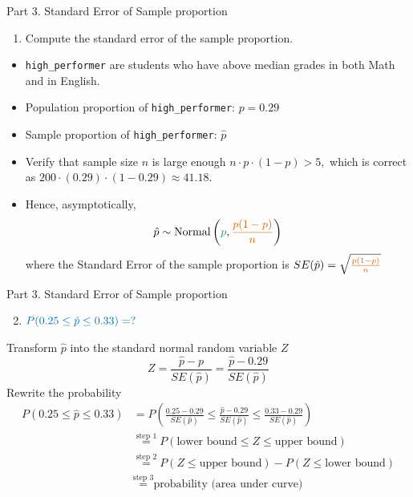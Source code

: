 \documentclass[
  10pt,
  ignorenonframetext,
]{beamer}
\providecommand{\tightlist}{%
  \setlength{\itemsep}{0pt}\setlength{\parskip}{0pt}}
\begin{document}
\begin{frame}[fragile]{Part 3. Standard Error of Sample proportion}
\protect\hypertarget{part-3.-standard-error-of-sample-proportion-1}{}
\begin{enumerate}
\tightlist
\item
  Compute the standard error of the sample proportion.
\end{enumerate}

\begin{itemize}
\item
  \texttt{high\_performer} are students who have above median grades in
  both Math and in English.
\item
  Population proportion of \texttt{high\_performer}: \(p = 0.29\)
\item
  Sample proportion of \texttt{high\_performer}: \(\hat{p}\)
\item
  Verify that sample size \(n\) is large enough
  \(n \cdot p \cdot (1-p) > 5,\) which is correct as
  \(200 \cdot (0.29) \cdot (1-0.29) \approx 41.18\).
\item
  Hence, asymptotically, \[
  \hat{p} \sim \text{Normal} \left({\color{green}{p}}, {\color{red}{\frac{p(1-p)}{n}}} \right)
  \] where the Standard Error of the sample proportion is
  \(SE(\hat{p}) = \sqrt{{\color{red}{\frac{p(1-p)}{n}}}}\)
\end{itemize}
\end{frame}

\begin{frame}{Part 3. Standard Error of Sample proportion}
\protect\hypertarget{part-3.-standard-error-of-sample-proportion-2}{}
\begin{enumerate}
\setcounter{enumi}{1}
\tightlist
\item
  \(\color{blue}{P(0.25 \leq \hat{p} \leq 0.33) = ?}\)
\end{enumerate}

\normalsize

Transform \(\hat{p}\) into the standard normal random variable \(Z\)
\small \[
Z = \frac{\hat{p} - p}{SE(\hat{p})} = \frac{\hat{p} - 0.29}{SE(\hat{p})}
\] \normalsize Rewrite the probability \small \[
\begin{aligned}
P(0.25 \leq \hat{p} \leq 0.33) &= P\left(\frac{0.25 - 0.29}{SE(\hat{p})} \leq \frac{\hat{p} - 0.29}{SE(\hat{p})} \leq \frac{0.33 - 0.29}{SE(\hat{p})}\right)\\
&\overset{\text{step 1}}{=} P\left(\text{lower bound} \leq Z \leq \text{upper bound}\right)\\
&\overset{\text{step 2}}{=} P\left(Z \leq \text{upper bound}\right) - P(Z \leq \text{lower bound})\\
&\overset{\text{step 3}}{=} \text{probability (area under curve)}
\end{aligned}
\]
\end{frame}
\end{document}
